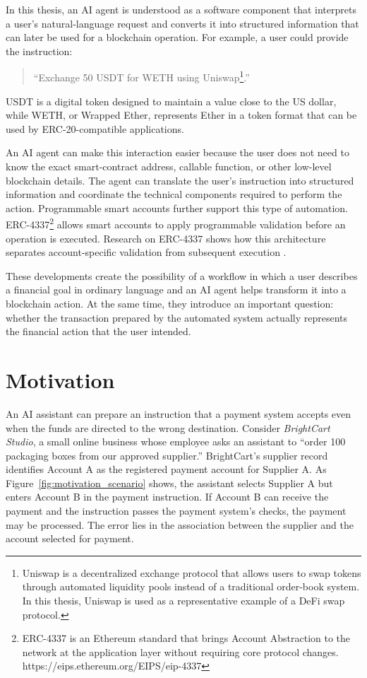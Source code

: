 In this thesis, an AI agent is understood as a software component that interprets a user's natural-language request and converts it into structured information that can later be used for a blockchain operation. For example, a user could provide the instruction:

\begin{quote}
``Exchange 50 USDT for WETH using Uniswap\footnote{Uniswap is a decentralized exchange protocol that allows users to swap tokens through automated liquidity pools instead of a traditional order-book system. In this thesis, Uniswap is used as a representative example of a DeFi swap protocol.}.''
\end{quote}

USDT is a digital token designed to maintain a value close to the US dollar, while WETH, or Wrapped Ether, represents Ether in a token format that can be used by ERC-20-compatible applications.

An AI agent can make this interaction easier because the user does not need to know the exact smart-contract address, callable function, or other low-level blockchain details. The agent can translate the user's instruction into structured information and coordinate the technical components required to perform the action. Programmable smart accounts further support this type of automation. ERC-4337\footnote{ERC-4337 is an Ethereum standard that brings Account Abstraction to the network at the application layer without requiring core protocol changes. https://eips.ethereum.org/EIPS/eip-4337} allows smart accounts to apply programmable validation before an operation is executed. Research on ERC-4337 shows how this architecture separates account-specific validation from subsequent execution \cite{buterinERC4337AccountAbstraction2021,
linMeasurementInvestigationERC43372024}.

These developments create the possibility of a workflow in which a user describes a financial goal in ordinary language and an AI agent helps transform it into a blockchain action. At the same time, they introduce an important question: whether the transaction prepared by the automated system actually represents the financial action that the user intended.



\section{Motivation}
\label{sec:motivation}

An AI assistant can prepare an instruction that a payment system accepts
even when the funds are directed to the wrong destination. Consider
\textit{BrightCart Studio}, a small online business whose employee asks
an assistant to ``order 100 packaging boxes from our approved supplier.'' BrightCart's supplier record identifies Account A as the registered
payment account for Supplier A. As Figure~\ref{fig:motivation_scenario}
shows, the assistant selects Supplier A but enters Account B in the
payment instruction. If Account B can receive the payment and the
instruction passes the payment system's checks, the payment may be
processed. The error lies in the association between the supplier and
the account selected for payment.

